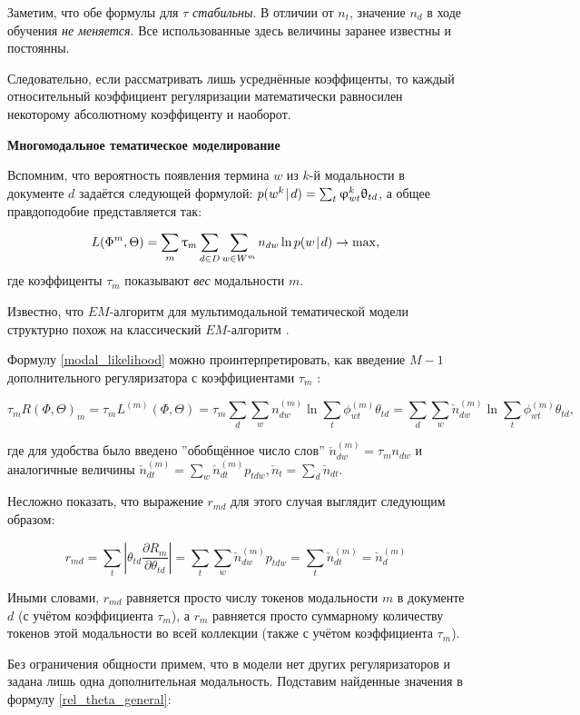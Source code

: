 Заметим, что обе формулы для $\tau$ \textit{стабильны}. В отличии от $n_t$, значение $n_d$ в ходе обучения \emph{не меняется}. Все использованные здесь величины заранее известны и постоянны.

Следовательно, если рассматривать лишь усреднённые коэффиценты, то каждый относительный коэффициент регуляризации математически равносилен некоторому абсолютному коэффиценту и наоборот.

\textbf{Многомодальное тематическое моделирование}


Вспомним, что вероятность появления термина $w$ из $k$-й модальности в документе $d$ задаётся следующей формулой:
$p(w^k \mspace{2mu}{|}\mspace{2mu} d) = \sum_t \upvarphi_{wt}^k \uptheta_{td}$, а общее правдоподобие представляется так:

\[
L(\Phi^m, \Theta) = \sum_m \uptau_m \sum_{d\in D} \sum_{w \in W^m} n_{dw} \ln p(w \mspace{2mu}{|}\mspace{2mu} d) \rightarrow \max, \label{modal_likelihood}
\]
где коэффиценты $\tau_m$ показывают \textit{вес} модальности $m$.

Известно, что $EM$-алгоритм для мультимодальной тематической модели структурно похож на классический $EM$-алгоритм \cite{yanina}\cite{vorontsov2015non}\cite{bulatov}. 

Формулу \ref{modal_likelihood} можно проинтерпретировать, как введение $M-1$ дополнительного регуляризатора с коэффициентами $\tau_m$ \cite{yanina}:

\[
\tau_m R(\Phi, \Theta)_m = \tau_m L^{(m)}(\Phi, \Theta) = \tau_m  \sum_d \sum_w n_{dw}^{(m)} \ln \sum_t \phi_{wt}^{(m)}\theta_{td} = 
\sum_d \sum_w \check{n}_{dw}^{(m)} \ln \sum_t \phi_{wt}^{(m)}\theta_{td},
\]

где для удобства было введено ''обобщённое число слов'' $\check{n}_{dw}^{(m)} = \tau_m n_{dw}$ и аналогичные величины $\check{n}_{dt}^{(m)} = \sum_w \check{n}_{dt}^{(m)} p_{tdw}, \check{n}_t = \sum_d \check{n}_{dt}$.

Несложно показать, что выражение $r_{md}$ для этого случая выглядит следующим образом:

\[
r_{md} = \sum_t |\theta_{td} \frac{\partial R_m}{\partial \theta_{td}}| = \sum_t \sum_w \check{n}_{dw}^{(m)} p_{tdw} = \sum_t  \check{n}_{dt}^{(m)} = \check{n}_{d}^{(m)}
\]

Иными словами, $r_{md}$ равняется просто числу токенов модальности $m$ в документе $d$ (с учётом коэффициента $\tau_m$), а $r_m$ равняется просто суммарному количеству токенов этой модальности во всей коллекции (также с учётом коэффициента $\tau_m$).

Без ограничения общности примем, что в модели нет других регуляризаторов и задана лишь одна дополнительная модальность. Подставим найденные значения в формулу \ref{rel_theta_general}:

